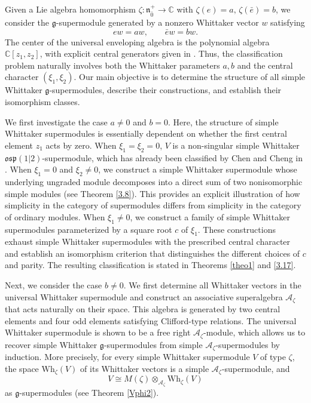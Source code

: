 \documentclass[a4paper,10pt]{article}
\theoremstyle{definition}
\theoremstyle{plain}
\theoremstyle{remark}
\theoremstyle{mystyle}
\numberwithin{equation}{section}
\begin{document}
Given a Lie algebra homomorphism $\zeta:\mathfrak n^+_{\bar 0}\to\mathbb C$ with $\zeta(e)=a,\,\zeta(\bar e)=b$, we consider the $\mathfrak g$-supermodule generated by a nonzero Whittaker vector $w$ satisfying
$$
ew=aw,\qquad \bar ew=bw.
$$
The center of the universal enveloping algebra is the polynomial algebra $\mathbb C[z_1,z_2]$, with explicit central generators given in \cite{C2026}. Thus, the classification problem naturally involves both the Whittaker parameters $a,b$ and the central character $(\xi_1,\xi_2)$. Our main objective is to determine the structure of all simple Whittaker $\mathfrak g$-supermodules, describe their constructions, and establish their isomorphism classes.

We first investigate the case $a\ne 0$ and $b=0$. Here, the structure of simple Whittaker supermodules is essentially dependent on whether the first central element $z_1$ acts by zero. When $\xi_1=\xi_2=0$, $V$ is a non-singular simple Whittaker $\mathfrak{osp}(1|2)$-supermodule, which has already been classified by Chen and Cheng in \cite[Corollary 19]{CCh24a}. When $\xi_1=0$ and $\xi_2\ne 0$, we construct a simple Whittaker supermodule whose underlying ungraded module decomposes into a direct sum of two nonisomorphic simple modules (see Theorem \ref{3.8}). This provides an explicit illustration of how simplicity in the category of supermodules differs from simplicity in the category of ordinary modules. When $\xi_1\ne 0$, we construct a family of simple Whittaker supermodules parameterized by a square root $c$ of $\xi_1$. These constructions exhaust simple Whittaker supermodules with the prescribed central character and establish an isomorphism criterion that distinguishes the different choices of $c$ and parity. The resulting classification is stated in Theorems \ref{theo1} and \ref{3.17}.

Next, we consider the case $b\ne 0$. We first determine all Whittaker vectors in the universal Whittaker supermodule and construct an associative superalgebra $\mathcal A_\zeta$ that acts naturally on their space. This algebra is generated by two central elements and four odd elements satisfying Clifford-type relations. The universal Whittaker supermodule is shown to be a free right $\mathcal A_\zeta$-module, which allows us to recover simple Whittaker $\mathfrak g$-supermodules from simple $\mathcal A_\zeta$-supermodules by induction. More precisely, for every simple Whittaker supermodule $V$ of type $\zeta$, the space $\mathrm{Wh}_{\zeta}(V)$ of its Whittaker vectors is a simple $\mathcal A_\zeta$-supermodule, and
$$
V\cong M(\zeta)\otimes_{\mathcal A_{\zeta}} \mathrm{Wh}_{\zeta}(V)
$$
as $\mathfrak g$-supermodules (see Theorem \ref{Vphi2}).
\end{document}
